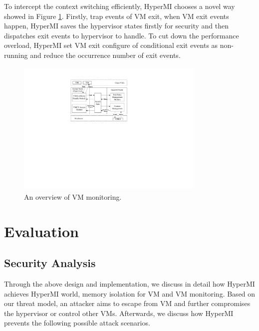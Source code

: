 \documentclass[conference]{IEEEtran}
\begin{document}
%
%
To intercept the context switching efficiently, HyperMI chooses a novel way showed in Figure \ref{fig4}. Firstly, trap events of VM exit, when VM exit events happen, HyperMI saves the hypervisor states firstly for security and then dispatches exit events to hypervisor to handle. To cut down the performance overload, HyperMI set VM exit configure of conditional exit events as non-running and reduce the occurrence number of exit events.

\begin{figure}
\centerline{\includegraphics[width=9cm,height=6.5cm]{pdfvmcs4.pdf}}%
\caption{An overview of VM monitoring.} \label{fig4}
\end{figure}


\section{Evaluation}
\subsection{Security Analysis}
Through the above design and implementation, we discuss in detail how HyperMI achieves HyperMI world,
memory isolation for VM and VM monitoring.
Based on our threat model, an attacker aims to escape from VM and further compromises the hypervisor or control other VMs.
Afterwards, we discuss how HyperMI prevents the following possible attack scenarios.
\end{document}
